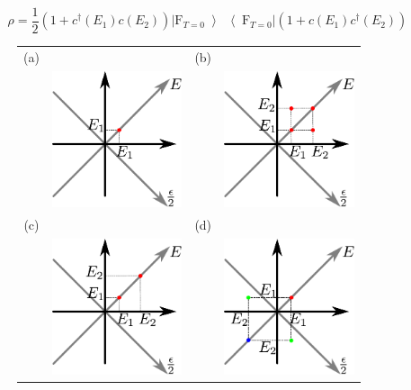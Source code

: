 \begin{equation}
\rho = \frac{1}{2}\left(1+c^{\dagger}\left(E_{1}\right)c\left(E_{2}\right)\right)\left|\mathrm{F}_{T=0}\left>\right<\mathrm{F}_{T=0}\right|\left(1+c\left(E_{1}\right)c^{\dagger}\left(E_{2}\right)\right) \label{eq: electron/hole superposition}
\end{equation}

\begin{figure}[hptb]
	\begin{center}
		\begin{tabular}{c c c c}
			(a) & & (b) & \\
			& \includegraphics[height = 4cm]{./chap1/schema_Glauber_one_elec_state}&
			& \includegraphics[height = 4cm]{./chap1/schema_Glauber_superpos_two_elec} 
			\\
			(c) &  & (d) & \\ 
			& \includegraphics[height = 4cm]{./chap1/schema_Glauber_mixed_two_elec} &
			& \includegraphics[height = 4cm]{./chap1/schema_Glauber_matrice_superpos_elec_ho}

\end{tabular}
\end{center}
\end{figure}
